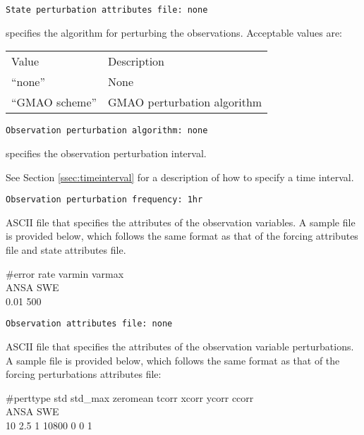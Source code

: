  \begin{Verbatim}[frame=single]
State perturbation attributes file: none
 \end{Verbatim}

 
  specifies the algorithm
 for perturbing the observations.
 Acceptable values are: 

 \begin{tabular}{ll}
 Value           & Description                 \\
 ``none''        & None                        \\
 ``GMAO scheme'' & GMAO perturbation algorithm \\
 \end{tabular}
 

 \begin{Verbatim}[frame=single]
Observation perturbation algorithm: none
 \end{Verbatim}

 
  specifies the observation
 perturbation interval.

 See Section \ref{ssec:timeinterval} for a description
 of how to specify a time interval.
 

 \begin{Verbatim}[frame=single]
Observation perturbation frequency: 1hr
 \end{Verbatim}

 
  ASCII file that
 specifies the attributes of the observation variables. 
 A sample file is provided below, which follows the same format 
 as that of the forcing attributes file and state attributes file. 

 \#error rate varmin  varmax \\ 
 \indent ANSA SWE                    \\
    0.01   500 
  
 

 \begin{Verbatim}[frame=single]
Observation attributes file: none
 \end{Verbatim}

 
  ASCII file that
 specifies the attributes of the observation variable perturbations. 
 A sample file is provided below, which follows the same format 
 as that of the forcing perturbations attributes file: 

 \#perttype  std    std\_max   zeromean  tcorr  xcorr ycorr ccorr \\
 \indent ANSA SWE                                                 \\
      10      2.5        1        10800       0    0    1 
 

